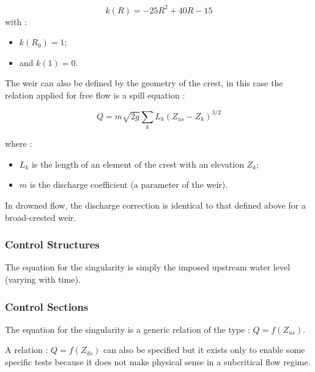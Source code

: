 \begin{equation}
  k(R) = -25 R^2 + 40 R -15
\end{equation}
with :
\begin{itemize}
 \item $k(R_0) = 1$;
 \item and $k(1) = 0$.
\end{itemize}


The weir can also be defined by the geometry of the crest, in this case the relation applied for free flow is a spill equation :


\begin{equation}
  Q = m \sqrt{2 g} \sum_{k} L_k (Z_{us} - Z_k)^{3/2}
\end{equation}

where :
\begin{itemize}
 \item $L_k$ is the length of an element of the crest with an elevation $Z_k$;
 \item $m$ is the discharge coefficient (a parameter of the weir).
\end{itemize}

In drowned flow, the discharge correction is identical to that defined above for a broad-crested weir.

\subsubsection{Control Structures}

The equation for the singularity is simply the imposed upstream water level (varying with time).

\subsubsection{Control Sections}

The equation for the singularity is a generic relation of the type : $Q = f(Z_{us})$.

A relation : $Q = f(Z_{ds})$ can also be specified but it exists only to enable some specific tests because it does not make physical sense in a subcritical flow regime.

